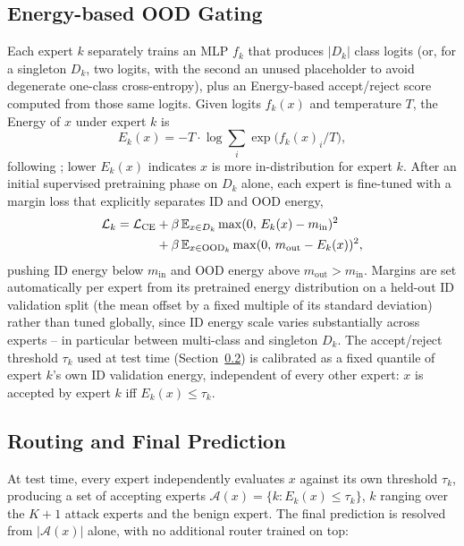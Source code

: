 \documentclass[sigconf]{acmart}
\begin{document}
\subsection{Energy-based OOD Gating} \label{ssec:ood-gating}
Each expert $k$ separately trains an MLP $f_k$ that produces $|D_k|$ class logits (or, for a singleton $D_k$, two logits, with the second an unused placeholder to avoid degenerate one-class cross-entropy), plus an Energy-based accept/reject score computed from those same logits. Given logits $f_k(x)$ and temperature $T$, the Energy of $x$ under expert $k$ is
\begin{equation}
E_k(x) = -T \cdot \log \sum_{i} \exp\big(f_k(x)_i / T\big),
\end{equation}
following \citep{liu2020energy}; lower $E_k(x)$ indicates $x$ is more in-distribution for expert $k$. After an initial supervised pretraining phase on $D_k$ alone, each expert is fine-tuned with a margin loss that explicitly separates ID and OOD energy,
\begin{align}
\mathcal{L}_k = \mathcal{L}_{\mathrm{CE}} &+ \beta \, \mathbb{E}_{x \in D_k} \max(0,\, E_k(x) - m_{\mathrm{in}})^2 \notag \\
&+ \beta \, \mathbb{E}_{x \in \text{OOD}_k} \max(0,\, m_{\mathrm{out}} - E_k(x))^2,
\end{align}
pushing ID energy below $m_{\mathrm{in}}$ and OOD energy above $m_{\mathrm{out}} > m_{\mathrm{in}}$. Margins are set automatically per expert from its pretrained energy distribution on a held-out ID validation split (the mean offset by a fixed multiple of its standard deviation) rather than tuned globally, since ID energy scale varies substantially across experts -- in particular between multi-class and singleton $D_k$. The accept/reject threshold $\tau_k$ used at test time (Section~\ref{ssec:routing}) is calibrated as a fixed quantile of expert $k$'s own ID validation energy, independent of every other expert: $x$ is accepted by expert $k$ iff $E_k(x) \leq \tau_k$.

\subsection{Routing and Final Prediction} \label{ssec:routing}
At test time, every expert independently evaluates $x$ against its own threshold $\tau_k$, producing a set of accepting experts $\mathcal{A}(x) = \{k : E_k(x) \leq \tau_k\}$, $k$ ranging over the $K{+}1$ attack experts and the benign expert. The final prediction is resolved from $|\mathcal{A}(x)|$ alone, with no additional router trained on top:
\end{document}
